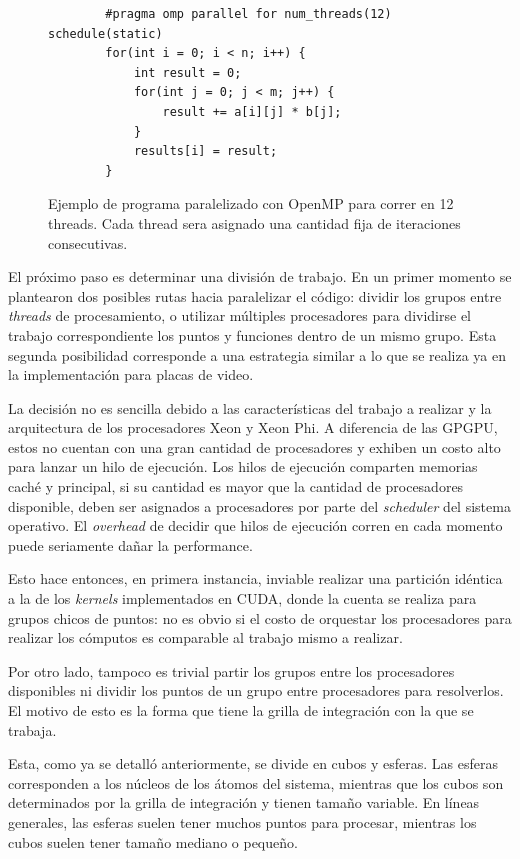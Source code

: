 \begin{figure}[htbp]
    \begin{lstlisting}
        #pragma omp parallel for num_threads(12) schedule(static)
        for(int i = 0; i < n; i++) {
            int result = 0;
            for(int j = 0; j < m; j++) {
                result += a[i][j] * b[j];
            }
            results[i] = result;
        }
    \end{lstlisting}
    \caption{Ejemplo de programa paralelizado con OpenMP para correr en 12 threads. Cada thread
    sera asignado una cantidad fija de iteraciones consecutivas.}
    \label{fig:openmp-example}
\end{figure}

El pr\'oximo paso es determinar una divisi\'on de trabajo. En un primer momento se plantearon dos posibles rutas
hacia paralelizar el c\'odigo: dividir los grupos entre \textit{threads} de
procesamiento, o utilizar m\'ultiples procesadores para dividirse el trabajo
correspondiente los puntos y funciones dentro de un mismo grupo. Esta segunda
posibilidad corresponde a una estrategia similar a lo que se realiza ya en la
implementaci\'on para placas de video.

La decisi\'on no es sencilla debido a las caracter\'isticas del trabajo a realizar
y la arquitectura de los procesadores Xeon y Xeon Phi. A diferencia de las GPGPU,
estos no cuentan con una gran cantidad de procesadores y exhiben un costo alto
para lanzar un hilo de ejecuci\'on. Los hilos de ejecuci\'on comparten memorias
cach\'e y principal, si su cantidad es mayor que la cantidad de procesadores disponible,
deben ser asignados a procesadores por parte del \textit{scheduler} del sistema
operativo. El \textit{overhead} de decidir que hilos de ejecuci\'on corren en cada
momento puede seriamente da\~nar la performance.

Esto hace entonces, en primera instancia, inviable realizar una partici\'on id\'entica a
la de los \textit{kernels} implementados en CUDA, donde la cuenta se realiza para
grupos chicos de puntos: no es obvio si el costo de orquestar los procesadores para
realizar los c\'omputos es comparable al trabajo mismo a realizar.

Por otro lado, tampoco es trivial partir los grupos entre los procesadores disponibles
ni dividir los puntos de un grupo entre procesadores para resolverlos.
El motivo de esto es la forma que tiene la grilla de integraci\'on con la que se trabaja.

Esta, como ya se detall\'o anteriormente, se divide en cubos y
esferas. Las esferas corresponden a los n\'ucleos de los \'atomos del sistema,
mientras que los cubos son determinados por la grilla de integraci\'on y tienen tama\~no
variable. En l\'ineas generales, las esferas suelen tener muchos puntos para procesar,
mientras los cubos suelen tener tama\~no mediano o peque\~no.

